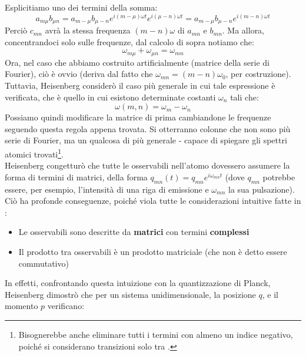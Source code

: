 \documentclass[FisicaTeorica.tex]{subfiles}
\begin{document}
Esplicitiamo uno dei termini della somma:
\[
a_{m\mu}b_{\mu n} = a_{m-\mu}b_{\mu-n}e^{i(m-\mu) \omega t} e^{i(\mu-n)\omega t} = a_{m-\mu} b_{\mu-n}e^{i(m-n)\omega t} %
\]
Perciò $c_{mn}$ avrà la stessa frequenza $(m-n)\omega$ di $a_{mn}$ e $b_{mn}$. Ma allora, concentrandoci solo sulle frequenze, dal calcolo di sopra notiamo che:
\[
\omega_{m\mu} + \omega_{\mu n} = \omega_{m n}
\]
Ora, nel caso che abbiamo costruito artificialmente (matrice della serie di Fourier), ciò è ovvio (deriva dal fatto che $\omega_{mn} = (m-n)\omega_0$, per costruzione). Tuttavia, Heisenberg considerò il caso più generale in cui tale espressione è verificata, che è quello in cui esistono determinate costanti $\omega_n$ tali che:
\[
\omega(m,n) = \omega_{m} - \omega_n
\]
Possiamo quindi modificare la matrice di prima cambiandone le frequenze seguendo questa regola appena trovata. Si otterranno colonne che non sono più serie di Fourier, ma un qualcosa di più generale - capace di spiegare gli spettri atomici trovati\footnote{Bisognerebbe anche eliminare tutti i termini con almeno un indice negativo, poiché si considerano transizioni solo tra .}.\\
Heisenberg congetturò che tutte le osservabili nell'atomo dovessero assumere la forma di termini di matrici, della forma $q_{mn}(t) = q_{mn}e^{i\omega_{mn}t}$ (dove $q_{mn}$ potrebbe essere, per esempio, l'intensità di una riga di emissione e $\omega_{mn}$ la sua pulsazione).\\
Ciò ha profonde conseguenze, poiché viola tutte le considerazioni intuitive fatte in \MC:
\begin{itemize}
    \item Le osservabili sono descritte da \textbf{matrici} con termini \textbf{complessi}
    \item Il prodotto tra osservabili è un prodotto matriciale (che non è detto essere commutativo)
\end{itemize}
In effetti, confrontando questa intuizione con la quantizzazione di Planck, Heisenberg dimostrò che per un sistema unidimensionale, la posizione $q$, e il momento $p$ verificano:
\end{document}
